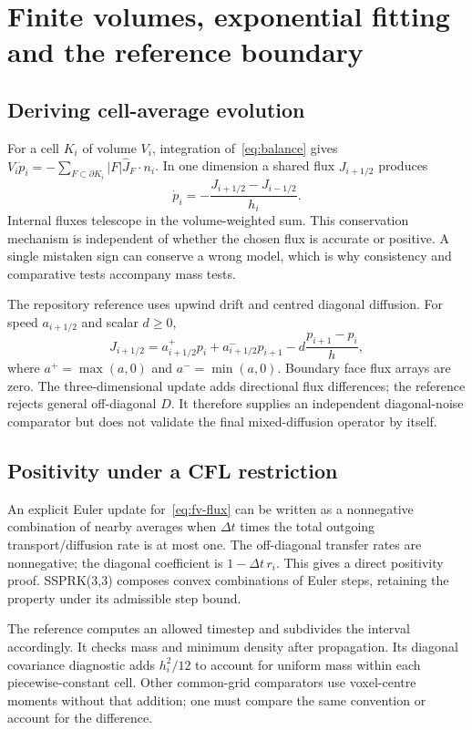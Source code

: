 \chapter{Finite volumes, exponential fitting and the reference boundary}\label{ch:fv}
\section{Deriving cell-average evolution}
For a cell $K_i$ of volume $V_i$, integration of~\eqref{eq:balance} gives $V_i\dot p_i=-\sum_{F\subset\partial K_i}|F|\widehat J_F\cdot n_i$. In one dimension a shared flux $J_{i+1/2}$ produces
\begin{equation}
\dot p_i=-\frac{J_{i+1/2}-J_{i-1/2}}{h_i}.
\end{equation}
Internal fluxes telescope in the volume-weighted sum. This conservation mechanism is independent of whether the chosen flux is accurate or positive. A single mistaken sign can conserve a wrong model, which is why consistency and comparative tests accompany mass tests.

The repository reference uses upwind drift and centred diagonal diffusion. For speed $a_{i+1/2}$ and scalar $d\ge0$,
\begin{equation}\label{eq:fv-flux}
J_{i+1/2}=a_{i+1/2}^+p_i+a_{i+1/2}^-p_{i+1}-d\frac{p_{i+1}-p_i}{h},
\end{equation}
where $a^+=\max(a,0)$ and $a^-=\min(a,0)$. Boundary face flux arrays are zero. The three-dimensional update adds directional flux differences; the reference rejects general off-diagonal $D$. It therefore supplies an independent diagonal-noise comparator but does not validate the final mixed-diffusion operator by itself.

\section{Positivity under a CFL restriction}
An explicit Euler update for~\eqref{eq:fv-flux} can be written as a nonnegative combination of nearby averages when $\Delta t$ times the total outgoing transport/diffusion rate is at most one. The off-diagonal transfer rates are nonnegative; the diagonal coefficient is $1-\Delta t\,r_i$. This gives a direct positivity proof. SSPRK(3,3) composes convex combinations of Euler steps, retaining the property under its admissible step bound.

The reference computes an allowed timestep and subdivides the interval accordingly. It checks mass and minimum density after propagation. Its diagonal covariance diagnostic adds $h_i^2/12$ to account for uniform mass within each piecewise-constant cell. Other common-grid comparators use voxel-centre moments without that addition; one must compare the same convention or account for the difference.

